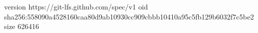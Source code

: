 version https://git-lfs.github.com/spec/v1
oid sha256:558090a4528160caa80d9ab10930cc909cbbb10410a95c5fb129b6032f7c5be2
size 626416
